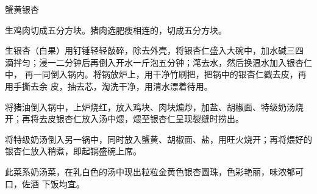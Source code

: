 %
%
%
%
%
%
%
\begin{recipe}{蟹黄银杏}

\ingredients


\preparation

\step 生鸡肉切成五分方块。猪肉选肥瘦相连的，切成五分方块。

\step 生银杏（白果）用钉锤轻轻敲碎，除去外壳，将银杏仁盛入大碗中，加水碱三四
滴拌匀；浸一二分钟后再倒入开水一斤泡五分钟；滗去水，然后换温水加入银杏仁中，
再一同倒入锅内。将锅放炉上，用干净竹刷把，把锅中的银杏仁戳去皮，再用手撕去余
皮，抽去芯，淘洗干净，用清水漂着待用。

\step 将猪油倒入锅中，上炉烧红，放入鸡块、肉块煸炒，加盐、胡椒面、特级奶汤烧
开；再将去皮银杏仁放入汤中煨，煨至银杏仁呈现裂缝时捞出。

\step 将特级奶汤倒入另一锅中，同时放入蟹黄、胡椒面、盐，用旺火烧开；再将煨好的
银杏仁放入稍煮，即起锅盛碗上席。

\features

此菜系奶汤菜，在乳白色的汤中现出粒粒金黄色银杏圆珠，色彩艳丽，味浓郁可口，佐酒
下饭均宜。

\end{recipe}

